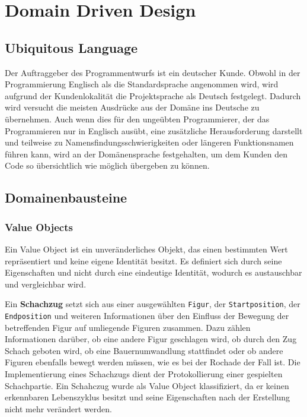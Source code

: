 \chapter{Domain Driven Design}

\section{Ubiquitous Language}

Der Auftraggeber des Programmentwurfs ist ein deutscher Kunde. 
Obwohl in der Programmierung Englisch als die Standardsprache angenommen wird, wird aufgrund der Kundenlokalität die Projektsprache als \glqq Deutsch\grqq{} festgelegt. 
Dadurch wird versucht die meisten Ausdrücke aus der Domäne ins Deutsche zu übernehmen. 
Auch wenn dies für den ungeübten Programmierer, der das Programmieren nur in Englisch ausübt, eine zusätzliche Herausforderung darstellt und teilweise zu Namensfindungsschwierigkeiten oder längeren Funktionsnamen führen kann, wird an der Domänensprache festgehalten, um dem Kunden den Code so übersichtlich wie möglich übergeben zu können.

\section{Domainenbausteine}

\subsection*{Value Objects}

Ein Value Object ist ein unveränderliches Objekt, das einen bestimmten Wert repräsentiert und keine eigene Identität besitzt. 
Es definiert sich durch seine Eigenschaften und nicht durch eine eindeutige Identität, wodurch es austauschbar und vergleichbar wird.



Ein \textbf{Schachzug} setzt sich aus einer ausgewählten \texttt{Figur}, der \texttt{Startposition}, der \texttt{Endposition} und weiteren Informationen über den Einfluss der Bewegung der betreffenden Figur auf umliegende Figuren zusammen. 
Dazu zählen Informationen darüber, ob eine andere Figur geschlagen wird, ob durch den Zug Schach geboten wird, ob eine Bauernumwandlung stattfindet oder ob andere Figuren ebenfalls bewegt werden müssen, wie es bei der Rochade der Fall ist. 
Die Implementierung eines Schachzugs dient der Protokollierung einer gespielten Schachpartie. 
Ein Schahczug wurde als Value Object klassifiziert, da er keinen erkennbaren Lebenszyklus besitzt und seine Eigenschaften nach der Erstellung nicht mehr verändert werden.

